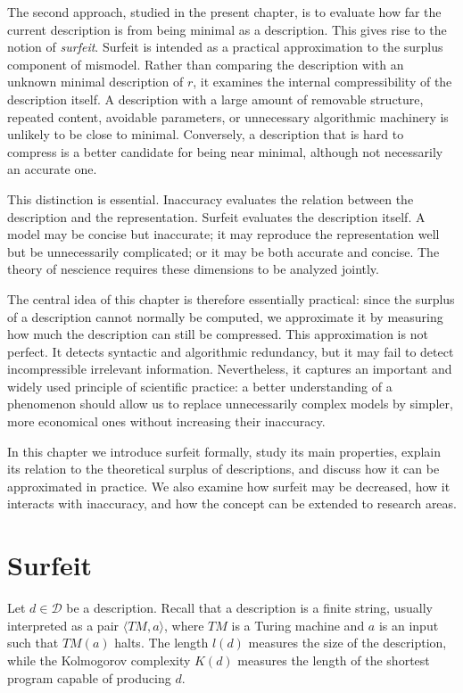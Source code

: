 The second approach, studied in the present chapter, is to evaluate how far the current description is from being minimal as a description. This gives rise to the notion of \emph{surfeit}. Surfeit is intended as a practical approximation to the surplus component of mismodel. Rather than comparing the description with an unknown minimal description of $r$, it examines the internal compressibility of the description itself. A description with a large amount of removable structure, repeated content, avoidable parameters, or unnecessary algorithmic machinery is unlikely to be close to minimal. Conversely, a description that is hard to compress is a better candidate for being near minimal, although not necessarily an accurate one.

This distinction is essential. Inaccuracy evaluates the relation between the description and the representation. Surfeit evaluates the description itself. A model may be concise but inaccurate; it may reproduce the representation well but be unnecessarily complicated; or it may be both accurate and concise. The theory of nescience requires these dimensions to be analyzed jointly.

The central idea of this chapter is therefore essentially practical: since the surplus of a description cannot normally be computed, we approximate it by measuring how much the description can still be compressed. This approximation is not perfect. It detects syntactic and algorithmic redundancy, but it may fail to detect incompressible irrelevant information. Nevertheless, it captures an important and widely used principle of scientific practice: a better understanding of a phenomenon should allow us to replace unnecessarily complex models by simpler, more economical ones without increasing their inaccuracy.

In this chapter we introduce surfeit formally, study its main properties, explain its relation to the theoretical surplus of descriptions, and discuss how it can be approximated in practice. We also examine how surfeit may be decreased, how it interacts with inaccuracy, and how the concept can be extended to research areas.

%
%

\section{Surfeit}
\label{sec:Definition_surfeit}

Let \(d\in\mathcal D\) be a description. Recall that a description is a finite string, usually interpreted as a pair \(\langle TM,a\rangle\), where \(TM\) is a Turing machine and \(a\) is an input such that \(TM(a)\) halts. The length \(l(d)\) measures the size of the description, while the Kolmogorov complexity \(K(d)\) measures the length of the shortest program capable of producing \(d\).

